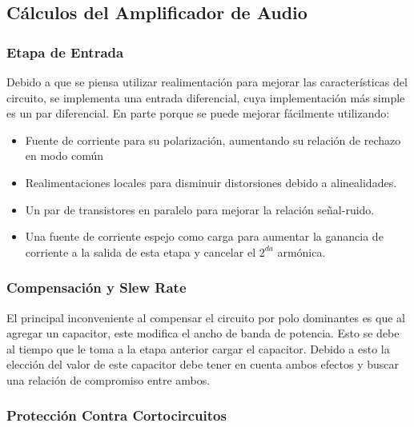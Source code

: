 \subsection{Cálculos del Amplificador de Audio}
\bigskip
\subsubsection{Etapa de Entrada}
Debido a que se piensa utilizar realimentación para mejorar las características del circuito, se implementa una entrada diferencial, cuya implementación más simple es un par diferencial. En parte porque se puede mejorar fácilmente utilizando:

\begin{itemize}
\item Fuente de corriente para su polarización, aumentando su relación de rechazo en modo común
\item Realimentaciones locales para disminuir distorsiones debido a alinealidades.
\item Un par de transistores en paralelo para mejorar la relación señal-ruido.
\item Una fuente de corriente espejo como carga para aumentar la ganancia de corriente a la salida de esta etapa y cancelar el $2^{da}$ armónica.
\end{itemize}

\bigskip
\subsubsection{Compensación y Slew Rate}

El principal inconveniente al compensar el circuito por polo dominantes es que al agregar un capacitor, este modifica el ancho de banda de potencia. Esto se debe al tiempo que le toma a la etapa anterior cargar el capacitor. Debido a esto la elección del valor de este capacitor debe tener en cuenta ambos efectos y buscar una relación de compromiso entre ambos.
\bigskip
\subsubsection{Protección Contra Cortocircuitos}\label{contra_cortos} 